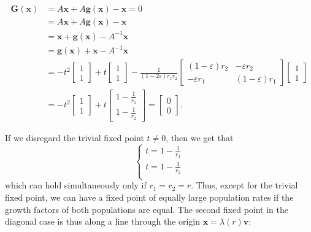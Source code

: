 \begin{align}
	\symbf{G}(\symbf{x}) &= A\symbf{x} + A \symbf{g}(\symbf{x}) - \symbf{x} = 0\\
	&= A\symbf{x} + A \symbf{g}(\symbf{x}) - \symbf{x}\\
	&= \symbf{x} + \symbf{g}(\symbf{x}) - A^{-1}\symbf{x}\\
	&= \symbf{g}(\symbf{x}) + \symbf{x} - A^{-1}\symbf{x}\\
	&= -t^2
	\begin{bmatrix}
		1\\
		1
	\end{bmatrix}
	+
	t
	\begin{bmatrix}
		1\\1
	\end{bmatrix}
	-
	\frac{1}{(1-2\varepsilon)r_1r_2}
	\begin{bmatrix}
		(1-\varepsilon)r_2 & -\varepsilon r_2\\
		-\varepsilon r_1 & (1-\varepsilon) r_1
	\end{bmatrix}
	\begin{bmatrix}
		1\\1
	\end{bmatrix}
	\\
		&=
	-t^2
	\begin{bmatrix}
		1\\1
	\end{bmatrix}
	+t 
	\begin{bmatrix}
		1 - \frac{1}{r_1}\\1 - \frac{1}{r_2}
	\end{bmatrix}
	=
	\begin{bmatrix}
		0\\0
	\end{bmatrix}.
\end{align}

If we disregard the trivial fixed point $t\neq 0$, then we get that
\begin{equation}
	\begin{cases}
		t = 1 - \frac{1}{r_1}\\
		t = 1 - \frac{1}{r_2}\\	
	\end{cases}
\end{equation}
which can hold simultaneously only if $r_1 = r_2 = r$. Thus, except for the trivial fixed point, we can have a fixed point of equally 
large population rates if the growth factors of both populations are equal. The second fixed point in the diagonal case is thus along a
line through the origin $\symbf{x}=\lambda(r)\symbf{v}$: 

